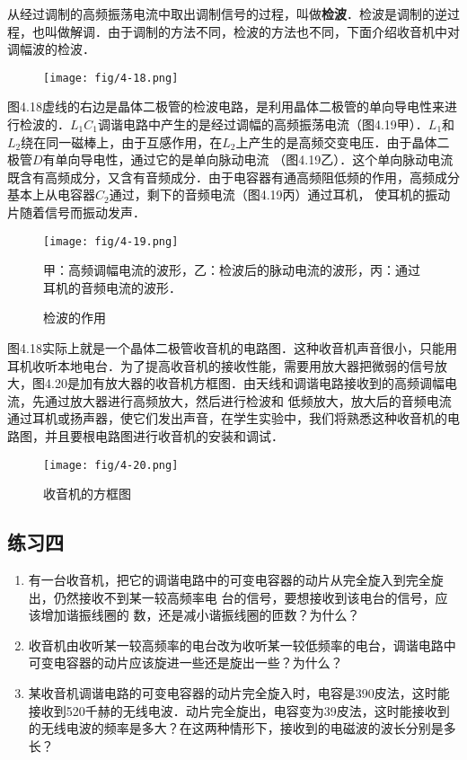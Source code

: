 从经过调制的高频振荡电流中取出调制信号的过程，叫做\textbf{检波}．检波是调制的逆过程，也叫做解调．由于调制的方法不同，检波的方法也不同，下面介绍收音机中对调幅波的检波．
\begin{figure}[htp]\centering
\texttt{[image: fig/4-18.png]}
\caption{}
\end{figure}

图4.18虚线的右边是晶体二极管的检波电路，是利用晶体二极管的单向导电性来进行检波的．$L_1C_1$调谐电路中产生的是经过调幅的高频振荡电流（图4.19甲）．$L_1$和$L_2$绕在同一磁棒上，由于互感作用，在$L_2$上产生的是高频交变电压．由于晶体二极管$D$有单向导电性，通过它的是单向脉动电流
（图4.19乙）．这个单向脉动电流既含有高频成分，又含有音频成分．由于电容器有通高频阻低频的作用，高频成分基本上从电容器$C_2$通过，剩下的音频电流（图4.19丙）通过耳机，
使耳机的振动片随着信号而振动发声．
\begin{figure}[htp]\centering
\texttt{[image: fig/4-19.png]}
\caption{检波的作用}
甲：高频调幅电流的波形，乙：检波后的脉动电流的波形，丙：通过耳机的音频电流的波形．
\end{figure}

图4.18实际上就是一个晶体二极管收音机的电路图．这种收音机声音很小，只能用耳机收听本地电台．为了提高收音机的接收性能，需要用放大器把微弱的信号放大，图4.20是加有放大器的收音机方框图．由天线和调谐电路接收到的高频调幅电流，先通过放大器进行高频放大，然后进行检波和
低频放大，放大后的音频电流通过耳机或扬声器，使它们发出声音，在学生实验中，我们将熟悉这种收音机的电路图，并且要根电路图进行收音机的安装和调试．
\begin{figure}[htp]\centering
\texttt{[image: fig/4-20.png]}
\caption{收音机的方框图}
\end{figure}


\subsection*{练习四}
\begin{enumerate}
	\item 有一台收音机，把它的调谐电路中的可变电容器的动片从完全旋入到完全旋出，仍然接收不到某一较高频率电
	台的信号，要想接收到该电台的信号，应该增加谐振线圈的
	数，还是减小谐振线圈的匝数？为什么？
	\item 收音机由收听某一较高频率的电台改为收听某一较低频率的电台，调谐电路中可变电容器的动片应该旋进一些还是旋出一些？为什么？
	\item 某收音机调谐电路的可变电容器的动片完全旋入时，电容是390皮法，这时能接收到520千赫的无线电波．动片完全旋出，电容变为39皮法，这时能接收到的无线电波的频率是多大？在这两种情形下，接收到的电磁波的波长分别是多长？
\end{enumerate}

